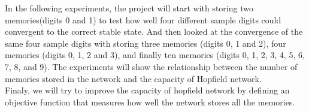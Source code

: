 In the following experiments, the project will start with storing two memories(digits 0 and 1) to test how well four different sample digits could convergent to the correct stable state. And then looked at the convergence of the same four sample digits with storing three memories (digits 0, 1 and 2), four memories (digits 0, 1, 2 and 3), and finally ten memories (digits 0, 1, 2, 3, 4, 5, 6, 7, 8, and 9). The experiments will show the relationship between the number of memories stored in the network and the capacity of Hopfield network. \\

Finaly, we will try to improve the capacity of hopfield network by defining an objective function that measures how well the network stores all the memories. 
